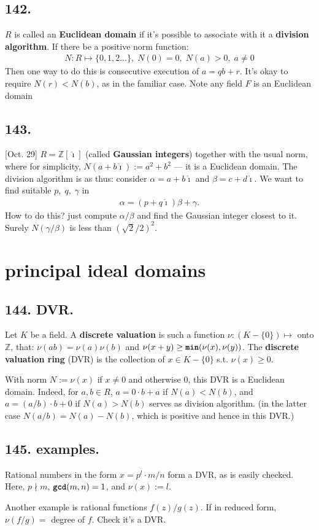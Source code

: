 \documentclass[12pt]{article}
\newcommand\aG\alpha \newcommand\bG\beta  \newcommand\gG\gamma \newcommand\dG\delta \newcommand\eG\varepsilon \newcommand\zG\zeta \newcommand\tG\vartheta \newcommand\kG\kappa \newcommand\lG\lambda \newcommand\sG\sigma \newcommand\fG\varphi \newcommand\oG\omega
\newcommand\R\sqrt%
\newcommand\M\cdot%
\newcommand\Mp\mapsto%
\newcommand{\ii}{ \mathring{\imath} }%
\newcommand{\BF}[1]{ \mathbb{#1} }%
\newcommand{\Ss}[1]{\textsf{\bfseries{#1}}}%
\newcommand{\Tw}[1]{\texttt{\bfseries{#1}}}%
\newcommand{\EqGo}[1]{ \begin{gather*}{#1}\end{gather*} } %
\begin{document}
\subsection*{142.} \(R\) is called an \Ss{Euclidean domain} if it's possible to associate with it a \Ss{division algorithm}. 
If there be a positive norm function:\EqGo{
 N: R \Mp \{0,1,2\dotsc\},\;
 N(0) =0,\; 
 N(a) >0,\; a \neq 0
} 
Then one way to do this is consecutive execution of \(a = qb + r\). It's okay to require \(N(r)<N(b)\), as in the familiar case. 
Note any field \(F\) is an Euclidean domain

\subsection*{143.} [Oct. 29] \(R= \BF Z[\ii]\) (called \Ss{Gaussian integers}) together with the usual norm, where for simplicity, \(N(a + b\ii) := a^2 + b^2\) --- it is a Euclidean domain. 
The division algorithm is as thus: consider \(\aG = a + b\ii\) and \(\bG = c + d\ii\). 
We want to find suitable \(p,\; q,\; \gG\) in \EqGo{
 \aG = (p +q\ii) \bG + \gG.
} How to do this? just compute \(\aG/\bG\) and find the Gaussian integer closest to it. 
Surely \(N(\gG/\bG)\) is less than \((\R{2}/2)^2\). 

\section{principal ideal domains}
\subsection*{144. DVR.} Let \(K\) be a field. 
A \Ss{discrete valuation} is such a function \(\nu: (K-\{0\}) \Mp\) onto \(\BF Z\), that: \(\nu(ab) = \nu(a)\nu(b)\) and \(\nu(x+y) \geq \Tw{min}(\nu(x), \nu(y))\). 
The \Ss{discrete valuation ring} (DVR) is the collection of \(x \in K-\{0\}\) s.t. \(\nu(x) \geq 0\). \par
With norm \(N:= \nu(x)\) if \(x \neq 0\) and otherwise 0, 
this DVR is a Euclidean domain. 
Indeed, for \(a,b \in R\), \(a= 0 \M b + a\) if \(N(a) < N(b)\), and \(a= (a/b) \M b + 0\) if \(N(a) > N(b)\) serves as division algorithm. 
(in the latter case \(N(a/b) = N(a)-N(b)\), which is positive and hence in this DVR.) 

\subsection*{145. examples.} Rational numbers in the form \(x= p^l \M m/n\) form a DVR, as is easily checked.  
Here, \(p \nmid m\), \(\Tw{gcd}(m,n) =1\), and \(\nu(x):= l\). \par
Another example is rational functions \(f(z)/g(z)\). 
If in reduced form, \(\nu(f/g) =\) degree of \(f\). 
Check it's a DVR. 
\end{document}
